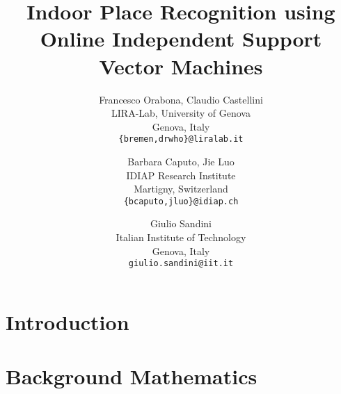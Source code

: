 \documentclass{bmvc}
\begin{document}

\title{Indoor Place Recognition using Online Independent Support Vector Machines}

\author{
Francesco Orabona, Claudio Castellini\\
LIRA-Lab, University of Genova\\
Genova, Italy\\
{\tt\small \{bremen,drwho\}@liralab.it}
\and
Barbara Caputo, Jie Luo\\
IDIAP Research Institute\\
Martigny, Switzerland\\
{\tt\small \{bcaputo,jluo\}@idiap.ch}
\and
Giulio Sandini\\
Italian Institute of Technology\\
Genova, Italy\\
{\tt\small giulio.sandini@iit.it}
}


\maketitle


\begin{abstract}
  
\end{abstract}

\section{Introduction}
\label{introduction}


%

\section{Background Mathematics}
\label{sec:bg}

\end{document}
